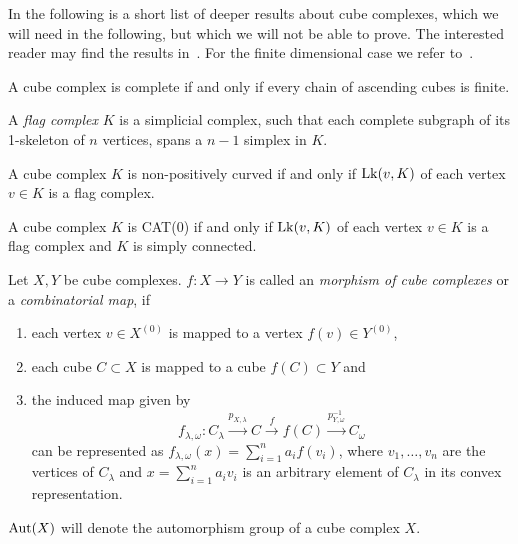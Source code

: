 In the following is a short list of deeper results about cube complexes, which we will need in the following, but which we will not be able to prove. The interested reader may find the results in~\cite[Appendices A, B]{MR3029427}. For the finite dimensional case we refer to~\cite[Sec. I.7, II.5]{MR1744486}.

\begin{thm}
  A cube complex is complete if and only if every chain of ascending cubes is finite.
\end{thm}


\begin{defin}
  A \emph{flag complex} \(K\) is a simplicial complex, such that each complete subgraph of its 1-skeleton of \(n\) vertices, spans a \(n-1\) simplex in \(K\).
\end{defin}

\begin{thm}
  \label{thm:link}
  A cube complex \(K\) is non-positively curved if and only if \(\operatorname{Lk}(v,K)\) of each vertex \(v \in K\) is a flag complex.

  A cube complex \(K\) is CAT(0) if and only if \(\operatorname{Lk}(v,K)\) of each vertex \(v \in K\) is a flag complex and \(K\) is simply connected.
\end{thm}

\begin{defin}
  \label{def:morphism-ccc}
  Let \(X,Y\) be cube complexes. \(f\colon X \to Y\) is called an \emph{morphism of cube complexes} or a \emph{combinatorial map}, if
  \begin{enumerate}
  \item each vertex \(v \in X^{(0)}\) is mapped to a vertex \(f(v) \in Y^{(0)}\),
  \item each cube \(C \subset X\) is mapped to a cube \(f(C) \subset Y\) and
  \item the induced map given by
    \[
      f_{\lambda, \omega}\colon C_\lambda \xrightarrow{p_{X,\lambda}} C \xrightarrow{f} f(C) \xrightarrow{p^{-1}_{Y,\omega}} C_\omega
    \]
    can be represented as \(f_{\lambda,\omega}(x) = \sum_{i=1}^n a_i f(v_i)\), where \(v_1, \dots, v_n\) are the vertices of \(C_\lambda\) and \(x = \sum_{i=1}^n a_i v_i\) is an arbitrary element of \(C_\lambda\) in its convex representation.
  \end{enumerate}
  \(\operatorname{Aut}(X)\) will denote the automorphism group of a cube complex \(X\).
\end{defin}

